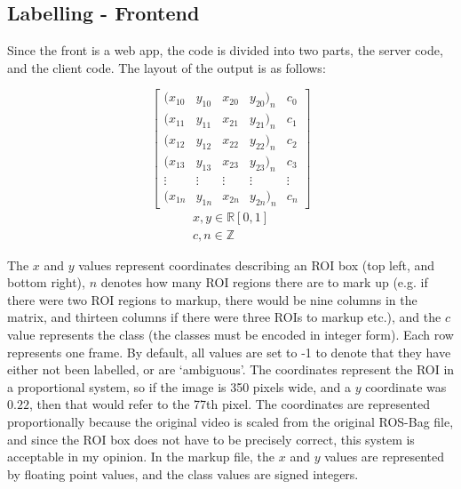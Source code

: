    \subsection{Labelling - Frontend}
    Since the front is a web app, the code is divided into two parts, the server code, and the client code. The layout of the output is as follows:

    \[
    \begin{bmatrix}
    (x_{10} & y_{10} & x_{20} & y_{20})_n & c_{0} \\
    (x_{11} & y_{11} & x_{21} & y_{21})_n & c_{1} \\
    (x_{12} & y_{12} & x_{22} & y_{22})_n & c_{2} \\
    (x_{13} & y_{13} & x_{23} & y_{23})_n & c_{3} \\
     \vdots & \vdots & \vdots & \vdots    & \vdots\\
    (x_{1n} & y_{1n} & x_{2n} & y_{2n})_n & c_{n} 
    \end{bmatrix}
    \]
    \begin{gather*}
    x, y \in \mathbb{R} [0, 1]\\
    c, n \in \mathbb{Z}
    \end{gather*}

    The $x$ and $y$ values represent coordinates describing an ROI box (top left, and bottom right), $n$ denotes how many ROI regions there are  to mark up (e.g. if there were two ROI regions to markup, there would be nine columns in the matrix, and thirteen columns if there were three ROIs to markup etc.), and the $c$ value represents the class (the classes must be encoded in integer form). Each row represents one frame. By default, all values are set to -1 to denote that they have either not been labelled, or are `ambiguous'. The coordinates represent the ROI in a proportional system, so if the image is 350 pixels wide, and a $y$ coordinate was $0.22$, then that would refer to the 77th pixel. The coordinates are represented proportionally because the original video is scaled from the original ROS-Bag file, and since the ROI box does not have to be precisely correct, this system is acceptable in my opinion. In the markup file, the $x$ and $y$ values are represented by floating point values, and the class values are signed integers.

